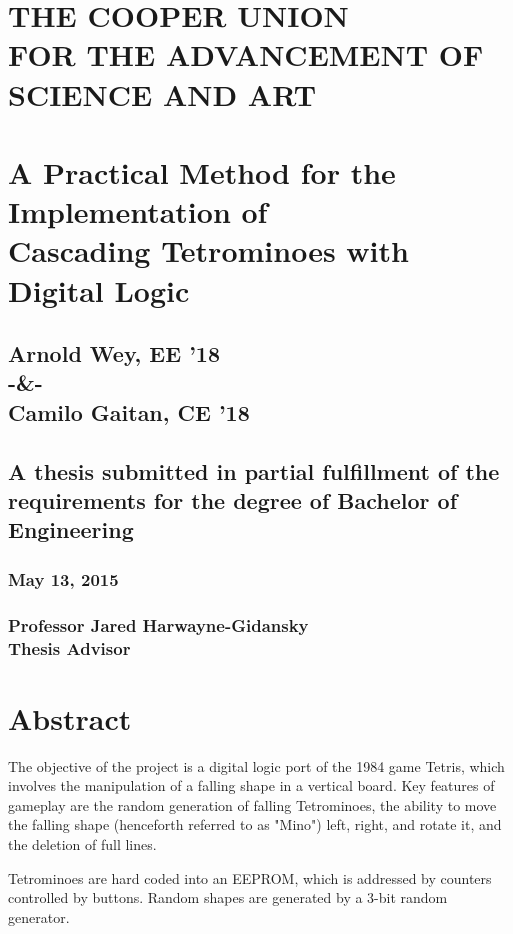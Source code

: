 \documentclass[letterpaper,titlepage,oneside]{article}
\begin{document}
\begin{center}
\section*{THE COOPER UNION \\FOR THE ADVANCEMENT OF SCIENCE AND ART\\[35pt]}
\section*{A Practical Method for the Implementation of \\Cascading Tetrominoes with Digital Logic\\[35pt]}
\subsection*{Arnold Wey, EE '18 \\[15pt]-\&-\\[15pt] Camilo Gaitan, CE '18\\[75pt]}
\subsection*{A thesis submitted in partial fulfillment of the requirements for the degree of Bachelor of Engineering\\[75pt]}
\subsubsection*{May 13, 2015\\[60pt]}
\subsubsection*{Professor Jared Harwayne-Gidansky\\[5pt]Thesis Advisor}
\end{center}
\pagebreak
\tableofcontents
\pagebreak
\section{Abstract}
The objective of the project is a digital logic port of the 1984 game Tetris, which involves the manipulation of a falling shape in a vertical board. Key features of gameplay are the random generation of falling Tetrominoes, the ability to move the falling shape (henceforth referred to as "Mino") left, right, and rotate it, and the deletion of full lines. 

Tetrominoes are hard coded into an EEPROM, which is addressed by counters controlled by buttons. Random shapes are generated by a 3-bit random generator.
\end{document}
